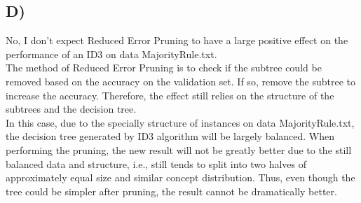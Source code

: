 \documentclass[11pt]{article}
\begin{document}
\subsection*{D)}
No, I don't expect Reduced Error Pruning to have a large positive effect on the performance of an ID3 on data MajorityRule.txt.
\\The method of Reduced Error Pruning is to check if the subtree could be removed based on the accuracy on the validation set. If so, remove the subtree  to increase the accuracy. Therefore, the effect still relies on the structure of the subtrees and the decision tree.
\\In this case, due to the specially structure of instances on data MajorityRule.txt, the decision tree generated by ID3 algorithm will be largely balanced. When performing the pruning, the new result will not be greatly better due to the still balanced data and structure, i.e., still tends to split into two halves of approximately equal size and similar concept distribution. Thus, even though the tree could be simpler after pruning, the result cannot be dramatically better.
\end{document}
